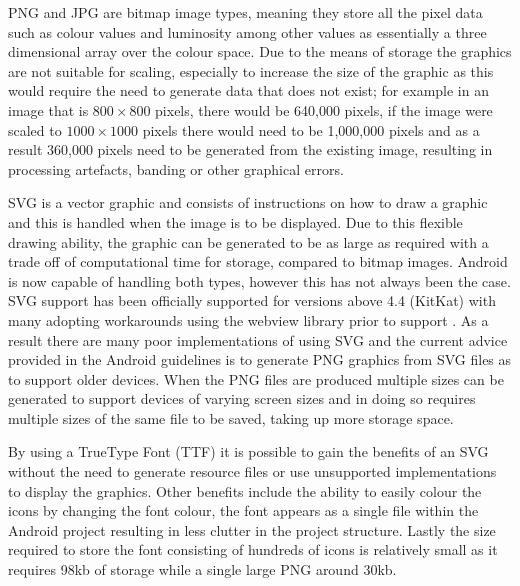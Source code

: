 PNG and JPG are bitmap image types, meaning they store all the pixel
data such as colour values and luminosity among other values as
essentially a three dimensional array over the colour space. Due to the
means of storage the graphics are not suitable for scaling, especially
to increase the size of the graphic as this would require the need to
generate data that does not exist; for example in an image that is
\(800 \times 800\) pixels, there would be 640,000 pixels, if the image
were scaled to \(1000 \times 1000\) pixels there would need to be
1,000,000 pixels and as a result 360,000 pixels need to be generated
from the existing image, resulting in processing artefacts, banding or
other graphical errors.

SVG is a vector graphic and consists of instructions on how to draw a
graphic and this is handled when the image is to be displayed. Due to
this flexible drawing ability, the graphic can be generated to be as
large as required with a trade off of computational time for storage,
compared to bitmap images. Android is now capable of handling both
types, however this has not always been the case. SVG support has been
officially supported for versions above 4.4 (KitKat) with many adopting
workarounds using the webview library prior to support
\parencite{svgAndroid}. As a result there are many poor implementations
of using SVG and the current advice provided in the Android guidelines
is to generate PNG graphics from SVG files as to support older devices.
When the PNG files are produced multiple sizes can be generated to
support devices of varying screen sizes and in doing so requires
multiple sizes of the same file to be saved, taking up more storage
space.

By using a TrueType Font (TTF) it is possible to gain the benefits of an
SVG without the need to generate resource files or use unsupported
implementations to display the graphics. Other benefits include the
ability to easily colour the icons by changing the font colour, the font
appears as a single file within the Android project resulting in less
clutter in the project structure. Lastly the size required to store the
font consisting of hundreds of icons is relatively small as it requires
98kb of storage while a single large PNG around 30kb.
